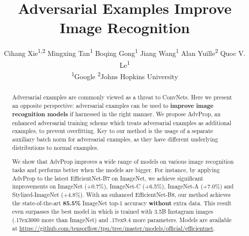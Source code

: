 \documentclass[10pt,twocolumn,letterpaper]{article}
\newcommand{\app}{\raise.17ex\hbox{}}
\begin{document}
\title{Adversarial Examples Improve Image Recognition}

\author{
Cihang Xie\textsuperscript{1,2}\footnotemark \quad
Mingxing Tan\textsuperscript{1} \quad
Boqing Gong\textsuperscript{1} \quad
Jiang Wang\textsuperscript{1} \quad
Alan Yuille\textsuperscript{2} \quad
Quoc V. Le\textsuperscript{1} \vspace{.3em}\\
\textsuperscript{1}Google \qquad\qquad \textsuperscript{2}Johns Hopkins University
\vspace{-.25em}
}

\maketitle
 \renewcommand*{\thefootnote}{\fnsymbol{footnote}}
 \setcounter{footnote}{1}
 \renewcommand*{\thefootnote}{\arabic{footnote}}
 \setcounter{footnote}{0}

\maketitle
\thispagestyle{empty}


\begin{abstract}
Adversarial examples are commonly viewed as a threat to ConvNets. Here we present an opposite perspective: adversarial examples can be used to \textbf{improve image recognition models} if harnessed in the right manner. We propose AdvProp, an enhanced adversarial training scheme which treats adversarial examples as additional examples, to prevent overfitting. Key to our method is the usage of a separate auxiliary batch norm for adversarial examples, as they have different underlying distributions to normal examples. 


We show that AdvProp  improves a wide range of models on various image recognition tasks and performs better when the models are bigger. For instance, by applying AdvProp to the latest EfficientNet-B7 \cite{Tan2019} on ImageNet, we achieve significant improvements on ImageNet (+0.7\%), ImageNet-C (+6.5\%), ImageNet-A (+7.0\%) and Stylized-ImageNet (+4.8\%). With an enhanced EfficientNet-B8, our method achieves the state-of-the-art \textbf{85.5\%} ImageNet top-1 accuracy \textbf{without} extra data. This result even surpasses the best model in \cite{Mahajan2018} which is trained with 3.5B Instagram images (\app 3000 more than ImageNet) and \app 9.4 more parameters. Models are available at \url{https://github.com/tensorflow/tpu/tree/master/models/official/efficientnet}.
\end{abstract}
\end{document}
